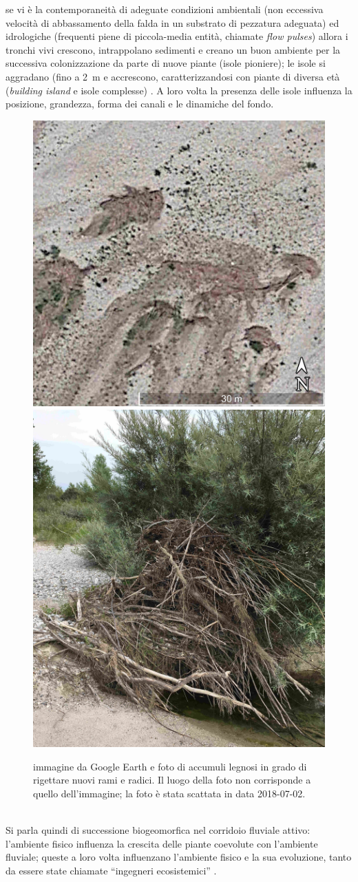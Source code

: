 se vi è la contemporaneità di adeguate condizioni ambientali (non eccessiva velocità di abbassamento della falda in un substrato di pezzatura adeguata) ed idrologiche (frequenti piene di piccola-media entità, chiamate \emph{flow pulses}) allora i tronchi vivi crescono, intrappolano sedimenti e creano un buon ambiente per la successiva colonizzazione da parte di nuove piante (isole pioniere);
le isole si aggradano (fino a \SI{2}{\m}  e accrescono, caratterizzandosi con piante di diversa età (\emph{building island} e isole complesse) .
A loro volta la presenza delle isole influenza la posizione, grandezza, forma dei canali e le dinamiche del fondo.
%
\begin{figure}
	\centering
	\includegraphics[width = .47\textwidth]{files/esempio_accumulo_sat_1.jpg}
	\quad
	\includegraphics[width = .47\textwidth]{files/esempio_accumulo_1.jpg}
	\caption[immagine e foto di accumuli legnosi]{immagine da Google Earth e foto di accumuli legnosi in grado di rigettare nuovi rami e radici. Il luogo della foto non corrisponde a quello dell'immagine; la foto è stata scattata in data 2018-07-02.}
	\label{fig:esempio-accumulo}
\end{figure}
%
\\
Si parla quindi di successione biogeomorfica nel corridoio fluviale attivo: l'ambiente fisico influenza la crescita delle piante coevolute con l'ambiente fluviale; queste a loro volta influenzano l'ambiente fisico e la sua evoluzione, tanto da essere state chiamate “ingegneri ecosistemici” .

